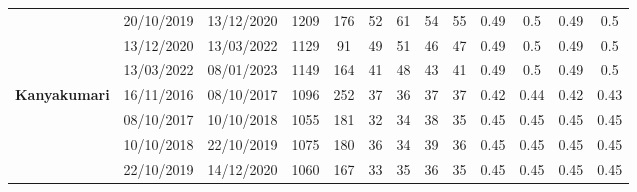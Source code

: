 \begin{table}[]
\begin{tabular}{|c|cc|cc|cccc|cccc|}
                                      & \multicolumn{1}{c|}{20/10/2019}          & 13/12/2020        & \multicolumn{1}{c|}{1209}           & 176           & \multicolumn{1}{c|}{52}     & \multicolumn{1}{c|}{61}     & \multicolumn{1}{c|}{54}     & 55     & \multicolumn{1}{c|}{0.49}   & \multicolumn{1}{c|}{0.5}    & \multicolumn{1}{c|}{0.49}   & 0.5    \\ \cline{2-13} 
                                      & \multicolumn{1}{c|}{13/12/2020}          & 13/03/2022        & \multicolumn{1}{c|}{1129}           & 91            & \multicolumn{1}{c|}{49}     & \multicolumn{1}{c|}{51}     & \multicolumn{1}{c|}{46}     & 47     & \multicolumn{1}{c|}{0.49}   & \multicolumn{1}{c|}{0.5}    & \multicolumn{1}{c|}{0.49}   & 0.5    \\ \cline{2-13} 
                                      & \multicolumn{1}{c|}{13/03/2022}          & 08/01/2023        & \multicolumn{1}{c|}{1149}           & 164           & \multicolumn{1}{c|}{41}     & \multicolumn{1}{c|}{48}     & \multicolumn{1}{c|}{43}     & 41     & \multicolumn{1}{c|}{0.49}   & \multicolumn{1}{c|}{0.5}    & \multicolumn{1}{c|}{0.49}   & 0.5    \\ \hline
\multirow{6}{*}{\textbf{Kanyakumari}} & \multicolumn{1}{c|}{16/11/2016}          & 08/10/2017        & \multicolumn{1}{c|}{1096}           & 252           & \multicolumn{1}{c|}{37}     & \multicolumn{1}{c|}{36}     & \multicolumn{1}{c|}{37}     & 37     & \multicolumn{1}{c|}{0.42}   & \multicolumn{1}{c|}{0.44}   & \multicolumn{1}{c|}{0.42}   & 0.43   \\ \cline{2-13} 
                                      & \multicolumn{1}{c|}{08/10/2017}          & 10/10/2018        & \multicolumn{1}{c|}{1055}           & 181           & \multicolumn{1}{c|}{32}     & \multicolumn{1}{c|}{34}     & \multicolumn{1}{c|}{38}     & 35     & \multicolumn{1}{c|}{0.45}   & \multicolumn{1}{c|}{0.45}   & \multicolumn{1}{c|}{0.45}   & 0.45   \\ \cline{2-13} 
                                      & \multicolumn{1}{c|}{10/10/2018}          & 22/10/2019        & \multicolumn{1}{c|}{1075}           & 180           & \multicolumn{1}{c|}{36}     & \multicolumn{1}{c|}{34}     & \multicolumn{1}{c|}{39}     & 36     & \multicolumn{1}{c|}{0.45}   & \multicolumn{1}{c|}{0.45}   & \multicolumn{1}{c|}{0.45}   & 0.45   \\ \cline{2-13} 
                                      & \multicolumn{1}{c|}{22/10/2019}          & 14/12/2020        & \multicolumn{1}{c|}{1060}           & 167           & \multicolumn{1}{c|}{33}     & \multicolumn{1}{c|}{35}     & \multicolumn{1}{c|}{36}     & 35     & \multicolumn{1}{c|}{0.45}   & \multicolumn{1}{c|}{0.45}   & \multicolumn{1}{c|}{0.45}   & 0.45   \\ \cline{2-13} 

\end{tabular}
\end{table}
